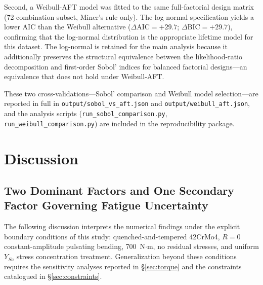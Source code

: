 \documentclass[12pt,a4paper]{article}
\begin{document}
Second, a Weibull-AFT model was fitted to the same full-factorial
design matrix (72-combination subset, Miner's rule only). The
log-normal specification yields a lower AIC than the Weibull
alternative ($\Delta\mathrm{AIC} = +29.7$; $\Delta\mathrm{BIC} =
+29.7$), confirming that the log-normal distribution is the
appropriate lifetime model for this dataset. The log-normal is
retained for the main analysis because it additionally preserves the
structural equivalence between the likelihood-ratio decomposition and
first-order Sobol' indices for balanced factorial designs---an
equivalence that does not hold under Weibull-AFT.

These two cross-validations---Sobol' comparison and Weibull model
selection---are reported in full in \texttt{output/sobol\_vs\_aft.json}
and \texttt{output/weibull\_aft.json}, and the analysis scripts
(\texttt{run\_sobol\_comparison.py}, \texttt{run\_weibull\_comparison.py})
are included in the reproducibility package.

\section{Discussion}
\label{sec:discussion}

\subsection{Two Dominant Factors and One Secondary Factor Governing Fatigue Uncertainty}

The following discussion interprets the numerical findings under the
explicit boundary conditions of this study: quenched-and-tempered
42CrMo4, $R=0$ constant-amplitude pulsating bending, 700~N$\cdot$m,
no residual stresses, and uniform $Y_{Sa}$ stress concentration
treatment. Generalization beyond these conditions requires the
sensitivity analyses reported in \S\ref{sec:torque} and the
constraints catalogued in \S\ref{sec:constraints}.
\end{document}
